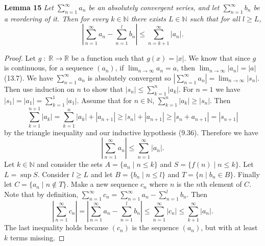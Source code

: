 \documentclass{article}
\begin{document}
\begin{flushleft}
\textbf{Lemma 15}
\textsl{Let $\sum_{n=1}^{\infty} a_n$ be an absolutely convergent series, and let $\sum_{n=1}^{\infty} b_n$ be a reordering of it. Then for every $k \in \mathbb{N}$ there exists $L \in \mathbb{N}$ such that for all $l \geq L$,
\[
\left | \sum_{n=1}^{\infty} a_n - \sum_{n=1}^{l} b_n \right | \leq \sum_{n=k+1}^{\infty} |a_n|.
\]}
\begin{proof}
Let $g \; : \; \mathbb{R} \rightarrow \mathbb{R}$ be a function such that $g(x) = |x|$. We know that since $g$ is continuous, for a sequence $(a_n)$, if $\lim_{n \rightarrow \infty} a_n = a$, then $\lim_{n \rightarrow \infty} |a_n| = |a|$ (13.7). We have $\sum_{n=1}^{\infty} a_n$ is absolutely convergent so $|\sum_{n=1}^{\infty} a_n| = \lim_{n \rightarrow \infty} |s_n|$. Then use induction on $n$ to show that $|s_n| \leq \sum_{k=1}^{n} |a_k|$. For $n=1$ we have $|s_1| = |a_1| = \sum_{k=1}^{1} |a_1|$. Assume that for $n \in \mathbb{N}$, $\sum_{k=1}^{n} |a_k| \geq |s_n|$. Then
\[
\sum_{k=1}^{n+1} |a_k| = \sum_{k=1}^{n} |a_k| + |a_{n+1}| \geq |s_n| + |a_{n+1}| \geq |s_n + a_{n+1}| = |s_{n+1}|
\]
by the triangle inequality and our inductive hypothesis (9.36). Therefore we have
\[
\left | \sum_{n=1}^{\infty} a_n \right | \leq \sum_{n=1}^{\infty} |a_n|.
\]
Let $k \in \mathbb{N}$ and consider the sets $A = \{a_n \mid n \leq k\}$ and $S = \{f(n) \mid n \leq k\}$. Let $L = \sup S$. Consider $l \geq L$ and let $B = \{b_n \mid n \leq l\}$ and $T = \{n \mid b_n \in B\}$. Finally let $C = \{a_n \mid n \notin T\}$. Make a new sequence $c_n$ where $n$ is the $n$th element of $C$. Note that by definition, $\sum_{n=1}^{\infty} c_n = \sum_{n=1}^{\infty} a_n - \sum_{n=1}^{l} b_n$. Then
\[
\left | \sum_{n=1}^{\infty} c_n \right | = \left | \sum_{n=1}^{\infty} a_n - \sum_{n=1}^{l} b_n \right | \leq \sum_{n=1}^{\infty} |c_n| \leq \sum_{k+1}^{\infty} |a_n|.
\]
The last inequality holds because $(c_n)$ is the sequence $(a_n)$, but with at least $k$ terms missing.
\end{proof}


\end{flushleft}
\end{document}
